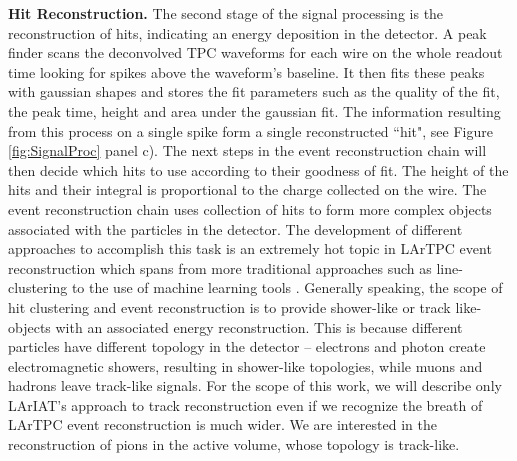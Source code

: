 \documentclass[aps,prl,twocolumn,showpacs,superscriptaddress,groupedaddress]{revtex4}  %
\begin{document}
\textbf{Hit Reconstruction.} The second stage of the signal processing is the reconstruction of hits, indicating an energy deposition in the detector.  A peak finder scans the deconvolved TPC waveforms for each wire on the whole readout time looking for spikes  above  the waveform's baseline. It then fits these peaks with gaussian shapes and stores the fit parameters such as the quality of the fit, the peak time, height and area under the gaussian fit. The information resulting from this process on a single spike form a single reconstructed ``hit", see Figure \ref{fig:SignalProc} panel c).
The next steps in the event reconstruction chain will then decide which hits to use according to their goodness of fit. %
The height of the hits and their integral is proportional to the charge collected on the wire.
The event reconstruction chain uses collection of hits to form more complex objects associated with the particles in the detector. The development of different approaches to accomplish this task is an extremely hot topic in LArTPC event reconstruction which spans from more traditional approaches such as line-clustering  \cite{Barker2011} to the use of machine learning tools \cite{1748-0221-12-03-P03011}. Generally speaking, the scope of hit clustering and event reconstruction is to provide shower-like or track like-objects with an associated energy reconstruction. This is because different particles have different topology in the detector -- electrons and photon create electromagnetic showers,  resulting in shower-like topologies, while muons and hadrons  leave track-like signals.  For the scope of this work, we will describe only LArIAT's approach to track reconstruction even if we recognize the breath of LArTPC event reconstruction is much wider. We are interested in the reconstruction of pions in the active volume, whose topology is track-like.\\
\end{document}
